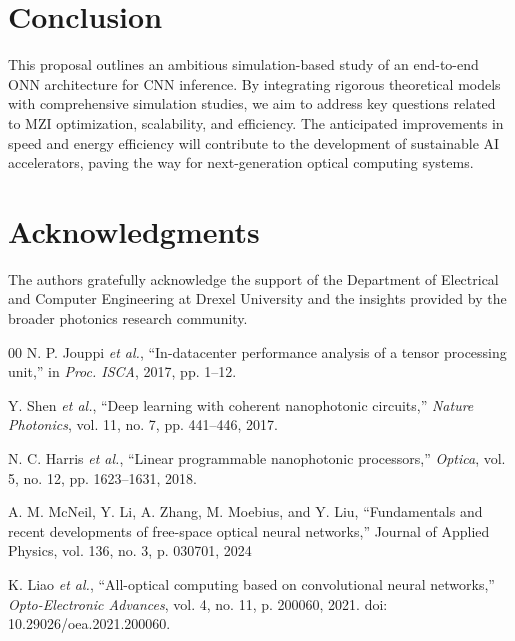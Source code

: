 \documentclass[conference]{IEEEtran}
\begin{document}
\section{Conclusion}
This proposal outlines an ambitious simulation-based study of an end-to-end ONN architecture for CNN inference. By integrating rigorous theoretical models with comprehensive simulation studies, we aim to address key questions related to MZI optimization, scalability, and efficiency. The anticipated improvements in speed and energy efficiency will contribute to the development of sustainable AI accelerators, paving the way for next-generation optical computing systems.

\section*{Acknowledgments}
The authors gratefully acknowledge the support of the Department of Electrical and Computer Engineering at Drexel University and the insights provided by the broader photonics research community.


\begin{thebibliography}{00}
N. P. Jouppi \emph{et al.}, ``In-datacenter performance analysis of a tensor processing unit,'' in \textit{Proc. ISCA}, 2017, pp. 1--12.

Y. Shen \emph{et al.}, ``Deep learning with coherent nanophotonic circuits,'' \textit{Nature Photonics}, vol. 11, no. 7, pp. 441--446, 2017.

N. C. Harris \emph{et al.}, ``Linear programmable nanophotonic processors,'' \textit{Optica}, vol. 5, no. 12, pp. 1623--1631, 2018.

A. M. McNeil, Y. Li, A. Zhang, M. Moebius, and Y. Liu, “Fundamentals and recent developments of free-space optical neural networks,” Journal of Applied Physics, vol. 136, no. 3, p. 030701, 2024

K. Liao \emph{et al.}, ``All-optical computing based on convolutional neural networks,'' \textit{Opto-Electronic Advances}, vol. 4, no. 11, p. 200060, 2021. doi: 10.29026/oea.2021.200060.

\end{thebibliography}
\end{document}
